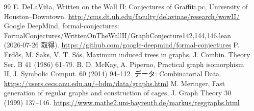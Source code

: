 \documentclass[paper=a4,fontsize=10.5pt,jafontsize=10.5pt]{jlreq}
\theoremstyle{plain}
\theoremstyle{definition}
\begin{document}
\begin{thebibliography}{99}
 E. DeLaViña, Written on the Wall II: Conjectures of Graffiti.pc, University of Houston--Downtown. \url{http://cms.dt.uh.edu/faculty/delavinae/research/wowII/}
 Google DeepMind, formal-conjectures: FormalConjectures/WrittenOnTheWallII/GraphConjecture{142,144,146}.lean (2026-07-26 取得). \url{https://github.com/google-deepmind/formal-conjectures}
 P. Erdős, M. Saks, V. T. Sós, Maximum induced trees in graphs, J. Combin. Theory Ser. B 41 (1986) 61--79.
 B. D. McKay, A. Piperno, Practical graph isomorphism II, J. Symbolic Comput. 60 (2014) 94--112. データ: Combinatorial Data. \url{https://users.cecs.anu.edu.au/~bdm/data/graphs.html}
 M. Meringer, Fast generation of regular graphs and construction of cages, J. Graph Theory 30 (1999) 137--146. \url{https://www.mathe2.uni-bayreuth.de/markus/reggraphs.html}
\end{thebibliography}
\end{document}

